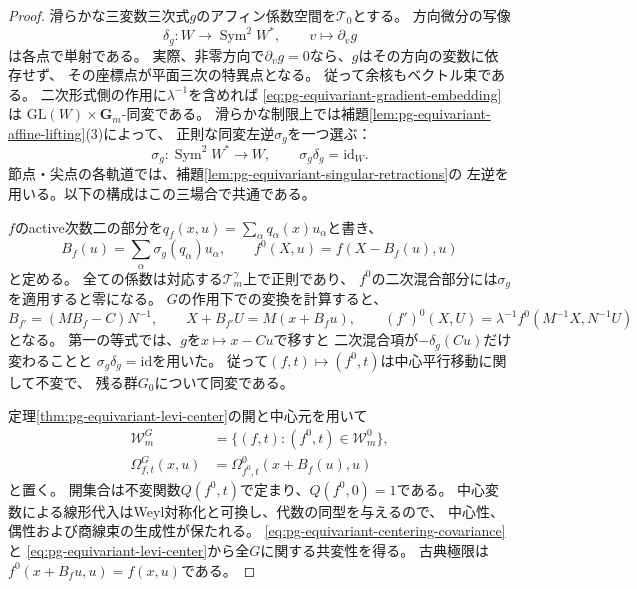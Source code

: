\begin{proof}
滑らかな三変数三次式$g$のアフィン係数空間を$\mathcal T_0$とする。
方向微分の写像
\begin{equation}
 \delta_g:W\longrightarrow\operatorname{Sym}^2W^*,
 \qquad v\longmapsto\partial_vg
 \label{eq:pg-equivariant-gradient-embedding}
\end{equation}
は各点で単射である。
実際、非零方向で$\partial_vg=0$なら、$g$はその方向の変数に依存せず、
その座標点が平面三次の特異点となる。
従って余核もベクトル束である。
二次形式側の作用に$\lambda^{-1}$を含めれば
\eqref{eq:pg-equivariant-gradient-embedding}は
$\mathrm{GL}(W)\times\mathbf G_m$-同変である。
滑らかな制限上では補題\ref{lem:pg-equivariant-affine-lifting}(3)によって、
正則な同変左逆$\sigma_g$を一つ選ぶ：
\begin{equation}
 \sigma_g:\operatorname{Sym}^2W^*\longrightarrow W,
 \qquad \sigma_g\delta_g=\mathrm{id}_W.
 \label{eq:pg-equivariant-gradient-retraction}
\end{equation}
節点・尖点の各軌道では、補題\ref{lem:pg-equivariant-singular-retractions}の
左逆を用いる。以下の構成はこの三場合で共通である。

$f$のactive次数二の部分を$q_f(x,u)=\sum_\alpha q_\alpha(x)u_\alpha$と書き、
\begin{equation}
 B_f(u)=\sum_\alpha\sigma_g(q_\alpha)u_\alpha,
 \qquad
 f^0(X,u)=f(X-B_f(u),u)
 \label{eq:pg-equivariant-centering}
\end{equation}
と定める。
全ての係数は対応する$\mathcal T_m^\gamma$上で正則であり、
$f^0$の二次混合部分には$\sigma_g$を適用すると零になる。
$G$の作用下での変換を計算すると、
\begin{equation}
 B_{f'}=(MB_f-C)N^{-1},\qquad
 X+B_{f'}U=M(x+B_fu),\qquad
 (f')^0(X,U)=\lambda^{-1}f^0(M^{-1}X,N^{-1}U)
 \label{eq:pg-equivariant-centering-covariance}
\end{equation}
となる。
第一の等式では、$g$を$x\mapsto x-Cu$で移すと
二次混合項が$-\delta_g(Cu)$だけ変わることと
$\sigma_g\delta_g=\mathrm{id}$を用いた。
従って$(f,t)\mapsto(f^0,t)$は中心平行移動に関して不変で、
残る群$G_0$について同変である。

定理\ref{thm:pg-equivariant-levi-center}の開と中心元を用いて
\begin{equation}
 \begin{aligned}
 \mathcal W_m^G
 &=\{(f,t):(f^0,t)\in\mathcal W_m^0\},\\
 \Omega^G_{f,t}(x,u)
 &=\Omega^0_{f^0,t}(x+B_f(u),u)
 \end{aligned}
 \label{eq:pg-equivariant-centered-quantization}
\end{equation}
と置く。
開集合は不変関数$Q(f^0,t)$で定まり、$Q(f^0,0)=1$である。
中心変数による線形代入はWeyl対称化と可換し、代数の同型を与えるので、
中心性、偶性および商線束の生成性が保たれる。
\eqref{eq:pg-equivariant-centering-covariance}と
\eqref{eq:pg-equivariant-levi-center}から全$G$に関する共変性を得る。
古典極限は$f^0(x+B_fu,u)=f(x,u)$である。
\end{proof}

